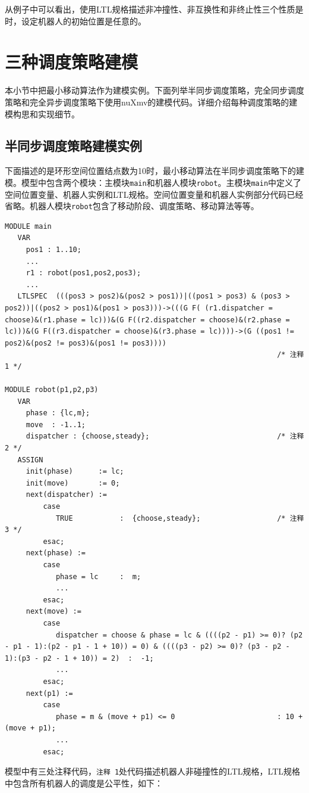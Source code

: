 从例子中可以看出，使用LTL规格描述非冲撞性、非互换性和非终止性三个性质是时，设定机器人的初始位置是任意的。

\section{三种调度策略建模}
本小节中把最小移动算法作为建模实例。下面列举半同步调度策略，完全同步调度策略和完全异步调度策略下使用nuXmv的建模代码。详细介绍每种调度策略的建模构思和实现细节。

\subsection{半同步调度策略建模实例}
下面描述的是环形空间位置结点数为10时，最小移动算法在半同步调度策略下的建模。模型中包含两个模块：主模块\verb|main|和机器人模块\verb|robot|。主模块\verb|main|中定义了空间位置变量、机器人实例和LTL规格。空间位置变量和机器人实例部分代码已经省略。机器人模块\verb|robot|包含了移动阶段、调度策略、移动算法等等。

\begin{lstlisting}
MODULE main
   VAR
     pos1 : 1..10;
     ...
     r1 : robot(pos1,pos2,pos3);
     ...
   LTLSPEC  (((pos3 > pos2)&(pos2 > pos1))|((pos1 > pos3) & (pos3 > pos2))|((pos2 > pos1)&(pos1 > pos3)))->(((G F( (r1.dispatcher = choose)&(r1.phase = lc)))&(G F((r2.dispatcher = choose)&(r2.phase = lc)))&(G F((r3.dispatcher = choose)&(r3.phase = lc))))->(G ((pos1 != pos2)&(pos2 != pos3)&(pos1 != pos3))))
                                                                /* 注释 1 */

MODULE robot(p1,p2,p3)
   VAR
     phase : {lc,m};
     move  : -1..1;
     dispatcher : {choose,steady};                              /* 注释 2 */
   ASSIGN
     init(phase)      := lc;
     init(move)       := 0;
     next(dispatcher) :=
         case
            TRUE           :  {choose,steady};                  /* 注释 3 */
         esac;
     next(phase) :=
         case
            phase = lc     :  m;
            ...
         esac;
     next(move) :=
         case
            dispatcher = choose & phase = lc & ((((p2 - p1) >= 0)? (p2 - p1 - 1):(p2 - p1 - 1 + 10)) = 0) & ((((p3 - p2) >= 0)? (p3 - p2 - 1):(p3 - p2 - 1 + 10)) = 2)  :  -1;
            ...
         esac;
     next(p1) :=
         case
            phase = m & (move + p1) <= 0                        : 10 + (move + p1);
            ...
         esac;
\end{lstlisting}

模型中有三处注释代码，\verb|注释 1|处代码描述机器人非碰撞性的LTL规格，LTL规格中包含所有机器人的调度是公平性，如下：

